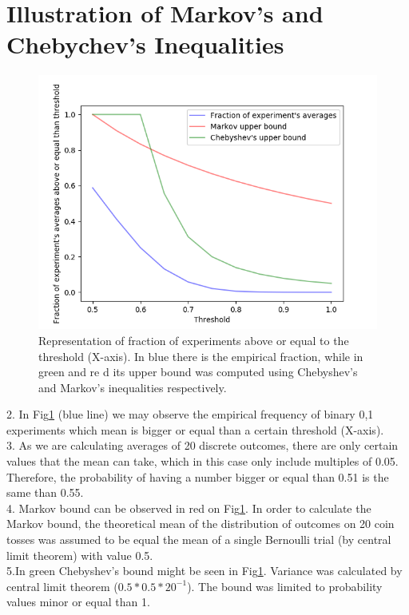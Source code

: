 \documentclass[a4paper]{article}
\begin{document}
\section{Illustration of Markov's and Chebychev's Inequalities}

\begin{figure}[H]
  \centering
  \includegraphics{plot1.png}
  \caption{Representation of fraction of experiments above or equal to the threshold (X-axis). In blue there is the empirical fraction, while in green and re d its upper bound was computed using Chebyshev's and Markov's inequalities respectively. }
  \label{fig:plot_bounds}
\end{figure}
2. In Fig\ref{fig:plot_bounds} (blue line) we may observe the empirical frequency of binary 0,1 experiments which mean is bigger or equal than a certain threshold (X-axis).  \\

3. As we are calculating averages of 20 discrete outcomes, there are only certain values that the mean can take, which in this case only include multiples of 0.05. Therefore, the probability of having a number bigger or equal than 0.51 is the same than 0.55. \\

4. Markov bound can be observed in red on  Fig\ref{fig:plot_bounds}. In order to calculate the Markov bound, the theoretical mean of the distribution of outcomes on 20 coin tosses was assumed to be equal the mean of a single Bernoulli trial (by central limit theorem) with value 0.5. \\

5.In green Chebyshev's bound might be seen in Fig\ref{fig:plot_bounds}. Variance was calculated by central limit theorem ($0.5*0.5*20^{-1}$). The bound was limited to probability values minor or equal than 1.\\
\end{document}
